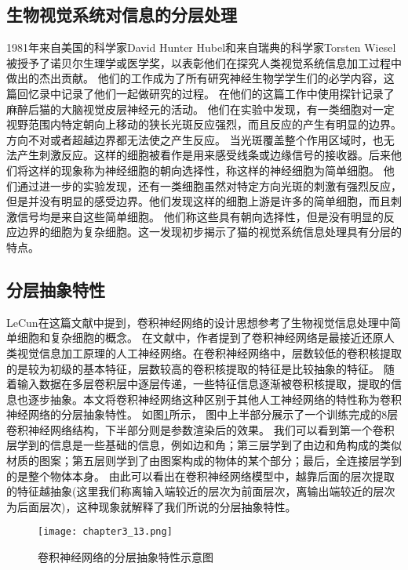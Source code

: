 \subsection{生物视觉系统对信息的分层处理}
1981年来自美国的科学家David Hunter Hubel和来自瑞典的科学家Torsten Wiesel被授予了诺贝尔生理学或医学奖，以表彰他们在探究人类视觉系统信息加工过程中做出的杰出贡献。
他们的工作成为了所有研究神经生物学学生们的必学内容，这篇回忆录\cite{Hubel1998EarlyEO}中记录了他们一起做研究的过程。
在他们的这篇工作\cite{https://doi.org/10.1113/jphysiol.1959.sp006308}中使用探针记录了麻醉后猫的大脑视觉皮层神经元的活动。
他们在实验中发现，有一类细胞对一定视野范围内特定朝向上移动的狭长光斑反应强烈，而且反应的产生有明显的边界。方向不对或者超越边界都无法使之产生反应。
当光斑覆盖整个作用区域时，也无法产生刺激反应。这样的细胞被看作是用来感受线条或边缘信号的接收器。后来他们将这样的现象称为神经细胞的朝向选择性，称这样的神经细胞为简单细胞。
他们通过进一步的实验发现，还有一类细胞虽然对特定方向光斑的刺激有强烈反应，但是并没有明显的感受边界。他们发现这样的细胞上游是许多的简单细胞，而且刺激信号均是来自这些简单细胞。
他们称这些具有朝向选择性，但是没有明显的反应边界的细胞为复杂细胞。这一发现初步揭示了猫的视觉系统信息处理具有分层的特点。

\subsection{分层抽象特性}
LeCun在这篇文献\cite{726791}中提到，卷积神经网络的设计思想参考了生物视觉信息处理中简单细胞和复杂细胞\cite{hubel1962}的概念。
在文献\cite{2019arXiv190906161K}中，作者提到了卷积神经网络是最接近还原人类视觉信息加工原理的人工神经网络。在卷积神经网络中，层数较低的卷积核提取的是较为初级的基本特征，层数较高的卷积核提取的特征是比较抽象的特征。
随着输入数据在多层卷积层中逐层传递，一些特征信息逐渐被卷积核提取，提取的信息也逐步抽象。本文将卷积神经网络这种区别于其他人工神经网络的特性称为卷积神经网络的分层抽象特性。
如图\ref{fig:chapter3_13}所示， 图中上半部分展示了一个训练完成的8层卷积神经网络结构，下半部分则是参数渲染后的效果。
我们可以看到第一个卷积层学到的信息是一些基础的信息，例如边和角；第三层学到了由边和角构成的类似材质的图案；第五层则学到了由图案构成的物体的某个部分；最后，全连接层学到的是整个物体本身。
由此可以看出在卷积神经网络模型中，越靠后面的层次提取的特征越抽象(这里我们称离输入端较近的层次为前面层次，离输出端较近的层次为后面层次)，这种现象就解释了我们所说的分层抽象特性。
\begin{figure}
    \centering
    \texttt{[image: chapter3\_13.png]}
    \caption{卷积神经网络的分层抽象特性示意图\cite{luyujie2018}}
    \label{fig:chapter3_13}
\end{figure}


